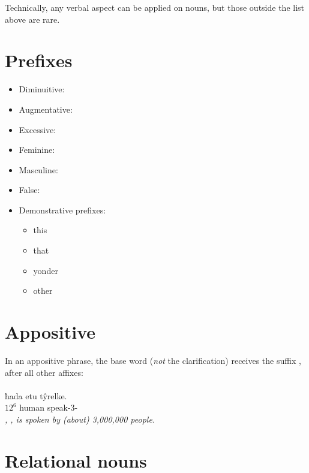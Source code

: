 \documentclass{book}
\begin{document}
Technically, any verbal aspect can be applied on nouns, but those outside the list above are rare.

\section{Prefixes}

\begin{itemize}
    \item Diminuitive: 
    \item Augmentative: 
    \item Excessive: 
    \item Feminine: 
    \item Masculine: 
    \item False: 
    \item Demonstrative prefixes:
    \begin{itemize}
        \item {} this
        \item {} that
        \item {} yonder
        \item {} other
    \end{itemize}
\end{itemize}

\section{Appositive}

In an appositive phrase, the base word (\emph{not} the clarification) receives the suffix , after all other affixes: \\
~ \\
  ħada etu tŷrelke. \\
$12^6$ human\bs{}
speak\bs{}-3- \\
\textit{, , is spoken by (about) 3,000,000 people.}

\section{Relational nouns}
\end{document}
